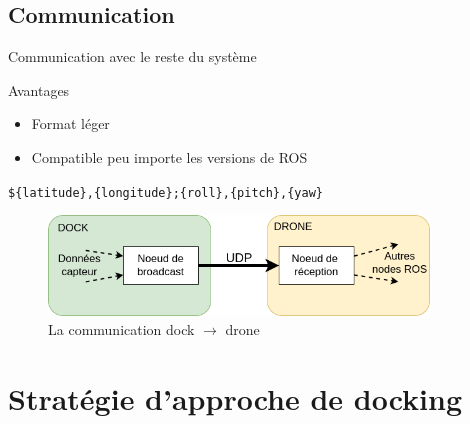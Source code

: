 \documentclass[pdftex,beamer,aspectratio=169]{beamer}
\theoremstyle{definition}
\theoremstyle{example}
\theoremstyle{plain}
\begin{document}
\subsection{Communication}

\begin{frame}[fragile]{Communication avec le reste du système}
  \centering
  \begin{minipage}{0.3\textwidth}
    \begin{exampleblock}{Avantages}
      \begin{itemize}
        \item Format léger
        \item Compatible peu importe les versions de ROS
      \end{itemize}
    \end{exampleblock}
  \end{minipage}
  \begin{minipage}{0.69\textwidth}
    \verb|${latitude},{longitude};{roll},{pitch},{yaw}|
  
    \begin{figure}[H]
      \centering
      \includegraphics[width=0.9\textwidth]{UDP_connexion.png}
      \caption{La communication dock $\rightarrow$ drone}
  \end{figure}

  \end{minipage}
\end{frame}

\section{Stratégie d'approche de docking}
\end{document}
